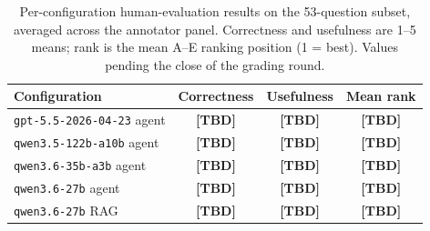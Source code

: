 \begin{table}[htbp]
\centering
\caption{Per-configuration human-evaluation results on the
53-question subset, averaged across the annotator panel.
Correctness and usefulness are 1--5 means; rank is the mean
A--E ranking position (1 = best). Values pending the close of
the grading round.}
\label{tab:human_eval_per_config}
\begin{tabular}{lccc}
\toprule
\textbf{Configuration} & \textbf{Correctness} & \textbf{Usefulness} & \textbf{Mean rank} \\
\midrule
\texttt{gpt-5.5-2026-04-23} agent & \textbf{[TBD]} & \textbf{[TBD]} & \textbf{[TBD]} \\
\texttt{qwen3.5-122b-a10b} agent  & \textbf{[TBD]} & \textbf{[TBD]} & \textbf{[TBD]} \\
\texttt{qwen3.6-35b-a3b} agent    & \textbf{[TBD]} & \textbf{[TBD]} & \textbf{[TBD]} \\
\texttt{qwen3.6-27b} agent        & \textbf{[TBD]} & \textbf{[TBD]} & \textbf{[TBD]} \\
\texttt{qwen3.6-27b} RAG          & \textbf{[TBD]} & \textbf{[TBD]} & \textbf{[TBD]} \\
\bottomrule
\end{tabular}
\end{table}
